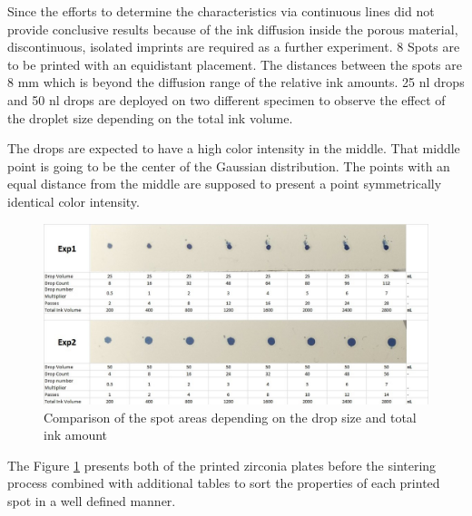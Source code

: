 Since the efforts to determine the characteristics via continuous lines did not provide conclusive results because of the ink diffusion inside the porous material, discontinuous, isolated imprints are required as a further experiment. 8 Spots are to be printed with an equidistant placement. The distances between the spots are 8 mm which is beyond the diffusion range of the relative ink amounts. 25 nl drops and 50 nl drops are deployed on two different specimen to observe the effect of the droplet size depending on the total ink volume. 

The drops are expected to have a high color intensity in the middle. That middle point is going to be the center of the Gaussian distribution. The points with an equal distance from the middle are supposed to present a point symmetrically identical color intensity.

\bigskip

\begin{figure}[H]
	\centering
	\includegraphics[width=1\textwidth]{grafiken/psfprint.jpg}
	\caption{Comparison of the spot areas depending on the drop size and total ink amount}
	\label{fig:psfprint}
\end{figure} 

\bigskip

The Figure \ref{fig:psfprint} presents both of the printed zirconia plates before the sintering process combined with additional tables to sort the properties of each printed spot in a well defined manner. 

